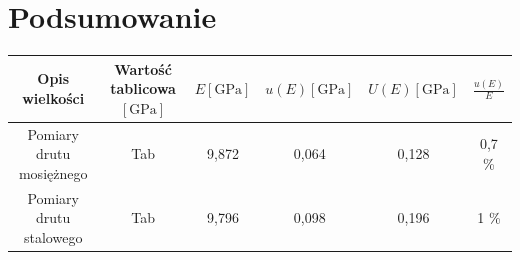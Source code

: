 \documentclass [a4paper,11pt]{article}
\begin{document}
	
	
	\section{Podsumowanie}
	
	\begin{center}
		\begin{tabular}{|c|c|c|c|c|c|}
			\hline Opis wielkości & Wartość tablicowa $\left[ \text{GPa} \right]$ & $E \left[ \text{GPa} \right]$ & $u(E) \left[ \text{GPa} \right]$ & $U(E) \left[ \text{GPa} \right]$ & $ \frac{u(E)}{E} $\\
			\hline Pomiary drutu mosiężnego & Tab & 9,872 & 0,064  & 0,128 & 0,7 \% \\ 
			\hline Pomiary drutu stalowego & Tab & 9,796  & 0,098  & 0,196 &  1 \%\\ 
			\hline 
		\end{tabular} 
	\end{center}
\end{document}
